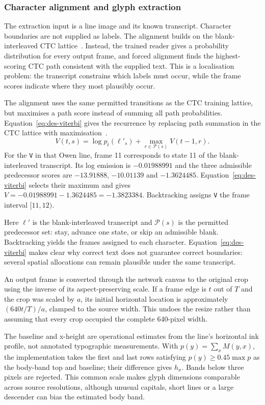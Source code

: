\subsubsection{Character alignment and glyph extraction}
\label{sec:des-alignment}
The extraction input is a line image and its known transcript. Character boundaries are not supplied as labels. The alignment builds on the blank-interleaved CTC lattice~\cite[pp.~4--5]{graves2006}. Instead, the trained reader gives a probability distribution for every output frame, and forced alignment finds the highest-scoring CTC path consistent with the supplied text. This is a localisation problem: the transcript constrains which labels must occur, while the frame scores indicate where they most plausibly occur.

The alignment uses the same permitted transitions as the CTC training lattice, but maximises a path score instead of summing all path probabilities. Equation~\ref{eq:des-viterbi} gives the recurrence by replacing path summation in the CTC lattice with maximisation~\cite[pp.~4--5]{graves2006}.
\begin{equation}
V(t,s)=\log p_t(\ell'_s)+\max_{r\in\mathcal P(s)}V(t-1,r).
\label{eq:des-viterbi}
\end{equation}
For the \texttt{V} in that Owen line, frame 11 corresponds to state 11 of the blank-interleaved transcript. Its log emission is $-0.01988991$ and the three admissible predecessor scores are $-13.91888$, $-10.01139$ and $-1.3624485$. Equation~\ref{eq:des-viterbi} selects their maximum and gives $V=-0.01988991-1.3624485=-1.3823384$. Backtracking assigns \texttt{V} the frame interval $[11,12)$.

Here $\ell'$ is the blank-interleaved transcript and $\mathcal P(s)$ is the permitted predecessor set: stay, advance one state, or skip an admissible blank. Backtracking yields the frames assigned to each character. Equation~\ref{eq:des-viterbi} makes clear why correct text does not guarantee correct boundaries: several spatial allocations can remain plausible under the same transcript.

An output frame is converted through the network canvas to the original crop using the inverse of its aspect-preserving scale. If a frame edge is $t$ out of $T$ and the crop was scaled by $a$, its initial horizontal location is approximately $(640t/T)/a$, clamped to the source width. This undoes the resize rather than assuming that every crop occupied the complete 640-pixel width.

The baseline and x-height are operational estimates from the line's horizontal ink profile, not annotated typographic measurements. With $p(y)=\sum_x M(y,x)$, the implementation takes the first and last rows satisfying $p(y)\geq0.45\max p$ as the body-band top and baseline; their difference gives $h_x$. Bands below three pixels are rejected. This common scale makes glyph dimensions comparable across source resolutions, although unusual capitals, short lines or a large descender can bias the estimated body band.

